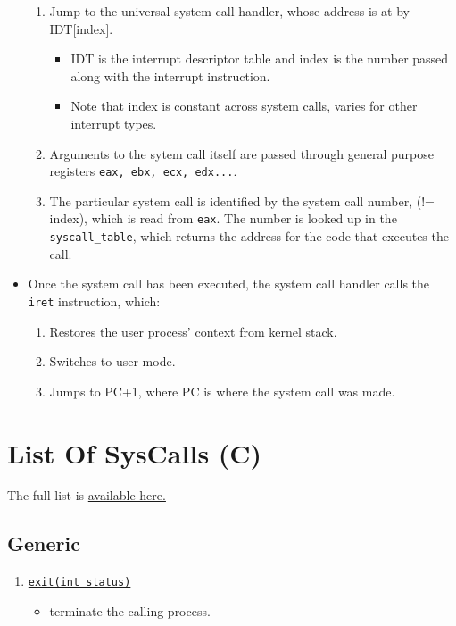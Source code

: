 \documentclass[10pt]{report}
\newcommand{\syscalldoc}[3]{
    \item \href{#2}{\texttt{#1}}
    \begin{itemize}
        #3
    \end{itemize}
}
\begin{document}
\begin{itemize}
\begin{enumerate}
\item Jump to the universal system call handler, whose address is at by IDT[index].
\begin{itemize}
    \item IDT is the interrupt descriptor table and index is the number passed along with the interrupt instruction.
    \item Note that index is constant across system calls, varies for other interrupt types.
\end{itemize}
\item Arguments to the sytem call itself are passed through general purpose registers \texttt{eax, ebx, ecx, edx...}.
\item The particular system call is identified by the system call number, (!= index), which is read from \texttt{eax}. The number is looked up in the \texttt{syscall\_table}, which returns the address for the code that executes the call. 
\end{enumerate}
\item Once the system call has been executed, the system call handler calls the \texttt{iret} instruction, which:
\begin{enumerate}
    \item Restores the user process' context from kernel stack.
    \item Switches to user mode.
    \item Jumps to PC+1, where PC is where the system call was made. 
\end{enumerate}
\end{itemize}
\section{List Of SysCalls (C)}
The full list is \href{https://www.cheat-sheets.org/saved-copy/Linux_Syscall_quickref.pdf}{available here.}
\subsection{Generic}
\begin{enumerate}
\syscalldoc{exit(int status)}
{https://man7.org/linux/man-pages/man3/exit.3.html}{
\item terminate the calling process.
}

\end{enumerate}
\end{document}

